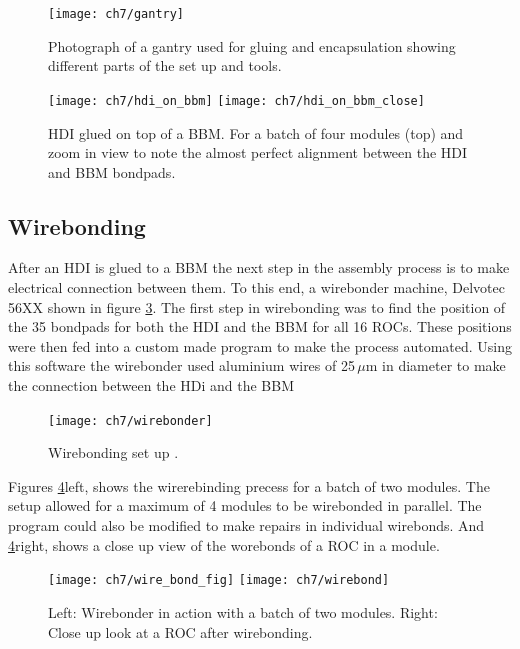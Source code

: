 \begin{figure}[!h]
	\centering
	\texttt{[image: ch7/gantry]}
	\caption[Gluing and encapsulation set up]{Photograph of a gantry used for gluing and encapsulation showing different parts of the set up and tools. }
	\label{fig:gantry}
\end{figure}

\begin{figure}[!h]
	\centering
	\texttt{[image: ch7/hdi\_on\_bbm]}
	\texttt{[image: ch7/hdi\_on\_bbm\_close]}
	\caption[Gluing result]{HDI glued on top of a BBM. For a batch of four modules (top) and zoom in view to note the almost perfect alignment between the HDI and BBM bondpads.}
	\label{fig:hdionbbm}
\end{figure}


\subsection{Wirebonding}
After an HDI is glued to a BBM the next step in the assembly process is to make electrical connection between them. To this end, a wirebonder machine, Delvotec 56XX shown in figure \ref{wirebonder}. The first step in wirebonding was to find the position of the 35 bondpads for both the HDI and the BBM for all 16 ROCs. These positions were then fed into a custom made program to make the process automated. Using this software the wirebonder used aluminium wires of 25\,$\mu$m in diameter to make the connection between the HDi and the BBM %

 
\begin{figure}[!h]
	\centering
  	\texttt{[image: ch7/wirebonder]}
  	\caption[wirebonder machine]{Wirebonding set up {}.}
  	\label{wirebonder}
\end{figure}

Figures \ref{wirebondinaction}left, shows the wirerebinding precess for a batch of two modules. The setup allowed for a maximum of 4 modules to be wirebonded in parallel. The program could also be modified to make repairs in individual wirebonds. And \ref{wirebondinaction}right, shows a close up view of the worebonds of a ROC in a module.

\begin{figure}[!h]
	\centering
  	\texttt{[image: ch7/wire\_bond\_fig]}
  	\texttt{[image: ch7/wirebond]}
  	\caption[Wirebonding process]{Left: Wirebonder in action with a batch of two modules. Right: Close up look at a ROC after wirebonding\cite{brian_disc}.}
  	\label{wirebondinaction}
\end{figure}


